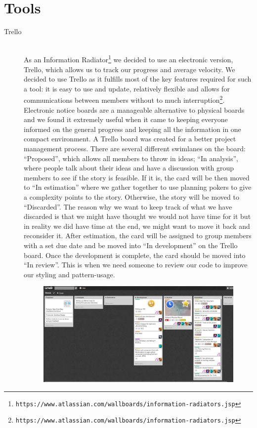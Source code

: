\documentclass[11pt]{article}
\begin{document}
\section{Tools}

\begin{description}
  \item[Trello] \hfill \\
  As an Information Radiator\footnote{\tt{https://www.atlassian.com/wallboards/information-radiators.jsp}} we decided to use an electronic version, Trello, which allows us to track our progress and average velocity. We decided to use Trello as it fulfills most of the key features required for such a tool: it is easy to use and update, relatively flexible and allows for communications between members without to much interruption\footnote{\tt{https://www.atlassian.com/wallboards/information-radiators.jsp}}. Electronic notice boards are a manageable alternative to physical boards and we found it extremely useful when it came to keeping everyone informed on the general progress and keeping all the information in one compact environment. 
  A Trello board was created for a better project management process. There are several different swimlanes on the board: ``Proposed'', which allows all members to throw in ideas; ``In analysis'', where people talk about their ideas and have a discussion with group members to see if the story is feasible. If it is, the card will be then moved to ``In estimation'' where we gather together to use planning pokers to give a complexity points to the story. Otherwise, the story will be moved to ``Discarded''. The reason why we want to keep track of what we have discarded is that we might have thought we would not have time for it but in reality we did have time at the end, we might want to move it back and reconsider it. After estimation, the card will be assigned to group members with a set due date and be moved into ``In development'' on the Trello board. Once the development is complete, the card should be moved into ``In review''. This is when we need someone to review our code to improve our styling and pattern-usage.  
\begin{figure}[h!]
\centering
\includegraphics[width=\textwidth]{Trello.png}

\end{figure}
\end{description}
\end{document}
